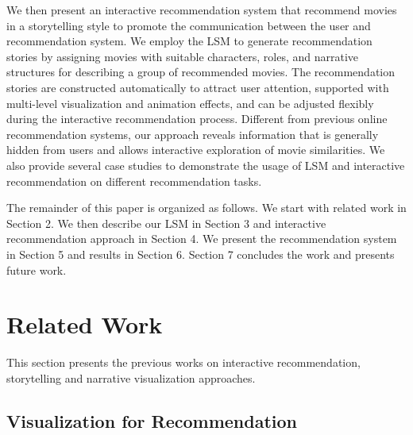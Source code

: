 \documentclass{vgtc}                          %
\begin{document}
We then present an interactive recommendation system that recommend movies in a storytelling style to promote the communication between the user and recommendation system.
We employ the LSM to generate recommendation stories by assigning movies with suitable characters, roles, and narrative structures for describing a group of recommended movies.
The recommendation stories are constructed automatically to attract user attention, supported with multi-level visualization and animation effects, and can be adjusted flexibly during the interactive recommendation process.
Different from previous online recommendation systems, our approach reveals information that is generally hidden from users and allows interactive exploration of movie similarities.
We also provide several case studies to demonstrate the usage of LSM and interactive recommendation on different recommendation tasks.

The remainder of this paper is organized as follows. 
We start with related work in Section 2.
We then describe our LSM in Section 3 and interactive recommendation approach in Section 4.
We present the recommendation system in Section 5 and results in Section 6.
Section 7 concludes the work and presents future work.

%
\section{Related Work}

This section presents the previous works on interactive recommendation, storytelling and narrative visualization approaches.

\subsection{Visualization for Recommendation}
\end{document}
